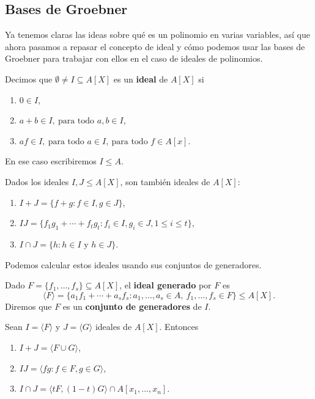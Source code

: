 \subsection{Bases de Groebner}
Ya tenemos claras las ideas sobre qué es un polinomio en varias variables, así que ahora pasamos a repasar el concepto de ideal y cómo podemos usar las bases de Groebner para trabajar con ellos en el caso de ideales de polinomios.
\begin{definicion}
    Decimos que $\emptyset \neq I \subseteq A[X]$ es un \textbf{ideal} de $A[X]$ si
    \begin{enumerate}
        \item $0\in I$,
        \item $a+b\in I,\ \text{para todo } a,b\in I$,
        \item $af\in I,\ \text{para todo } a\in I,\ \text{para todo } f\in A[x]$.
    \end{enumerate}
    En ese caso escribiremos $I\le A$.
\end{definicion}

\begin{proposicion}
    Dados los ideales $I,J\le A[X]$, son también ideales de $A[X]$:
    \begin{enumerate}
        \item $I+J = \{f+g : f\in I, g\in J\}$,
        \item $IJ = \{f_1g_1 + \cdots + f_tg_t : f_i\in I, g_i\in J, 1\le i \le t\}$,
        \item $I\cap J = \{h: h\in I \text{ y } h\in J\}$.
    \end{enumerate}
\end{proposicion}

Podemos calcular estos ideales usando sus conjuntos de generadores.
\begin{definicion}
    Dado $F=\{f_1,\dots, f_s\}\subseteq A[X]$, el \textbf{ideal generado} por $F$ es
    \begin{equation*}
        \langle F \rangle = \{a_1f_1 + \cdots + a_sf_s : a_1,\dots, a_s\in A,\ f_1,\dots, f_s\in F\}\le A[X].
    \end{equation*}
    Diremos que $F$ es un \textbf{conjunto de generadores} de $I$.
\end{definicion}

\begin{proposicion}
    Sean $I=\langle F\rangle$ y $J=\langle G\rangle$ ideales de $A[X]$. Entonces
    \begin{enumerate}
        \item $I+J = \langle F\cup G\rangle$,
        \item $IJ = \langle fg : f\in F, g\in G \rangle$,
        \item $I\cap J = \langle tF, (1-t)G \rangle \cap A[x_1,\dots, x_n]$.
    \end{enumerate}
\end{proposicion}

